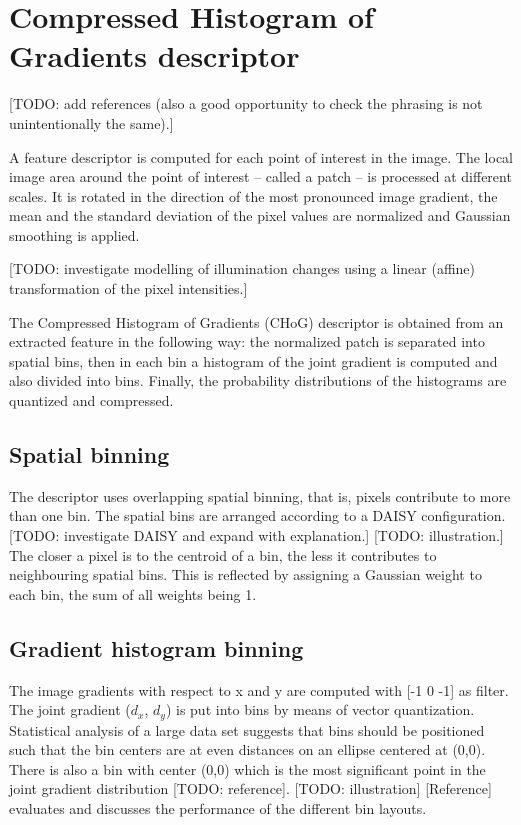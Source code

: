 \section{Compressed Histogram of Gradients descriptor}

[TODO: add references (also a good opportunity to check the phrasing is not unintentionally the same).]

A feature descriptor is computed for each point of interest in the image. The local image area around the point of interest -- called a patch -- is processed at different scales. It is rotated in the direction of the most pronounced image gradient, the mean and the standard deviation of the pixel values are normalized and Gaussian smoothing is applied.

[TODO: investigate modelling of illumination changes using a linear (affine) transformation of the pixel intensities.]

The Compressed Histogram of Gradients (CHoG) descriptor is obtained from an extracted feature in the following way: the normalized patch is separated into spatial bins, then in each bin a histogram of the joint gradient is computed and also divided into bins. Finally, the probability distributions of the histograms are quantized and compressed.

\subsection{Spatial binning}

The descriptor uses overlapping spatial binning, that is, pixels contribute to more than one bin. The spatial bins are arranged according to a DAISY configuration. [TODO: investigate DAISY and expand with explanation.] [TODO: illustration.] The closer a pixel is to the centroid of a bin, the less it contributes to neighbouring spatial bins. This is reflected by assigning a Gaussian weight to each bin, the sum of all weights being 1.

\subsection{Gradient histogram binning}

The image gradients with respect to x and y are computed with [-1 0 -1] as filter. The joint gradient ($d_x$, $d_y$) is put into bins by means of vector quantization. Statistical analysis of a large data set suggests that bins should be positioned such that the bin centers are at even distances on an ellipse centered at (0,0). There is also a bin with center (0,0) which is the most significant point in the joint gradient distribution [TODO: reference]. [TODO: illustration] [Reference] evaluates and discusses the performance of the different bin layouts.

